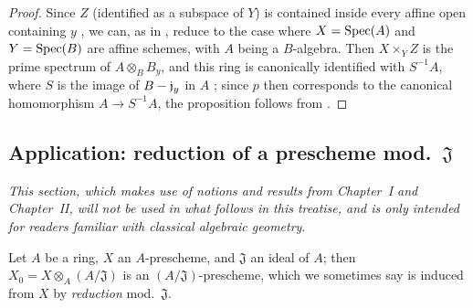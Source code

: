 \begin{proof}
\label{proof-1.3.6.5}
Since $Z$ (identified as a subspace of $Y$) is contained inside every affine open containing $y$ , we can, as in , reduce to the case where $X=\operatorname{Spec}(A)$ and $Y=\operatorname{Spec}(B)$ are affine schemes, with $A$ being a $B$-algebra.
Then $X\times_Y Z$ is the prime spectrum of $A\otimes_B B_y$, and this ring is canonically identified with $S^{-1}A$, where $S$ is the image of $B-\mathfrak{j}_y$ in $A$ ; since $p$ then corresponds to the canonical homomorphism $A\to S^{-1}A$, the proposition follows from .
\end{proof}

\subsection{Application: reduction of a prescheme mod.~$\mathfrak{J}$}
\label{subsection:1.3.7}

\emph{This section, which makes use of notions and results from Chapter~I and Chapter~II, will not be used in what follows in this treatise, and is only intended for readers familiar with classical algebraic geometry}.

\begin{env}[3.7.1]
\label{1.3.7.1}
Let $A$ be a ring, $X$ an $A$-prescheme, and $\mathfrak{J}$ an ideal of $A$; then $X_0=X\otimes_A(A/\mathfrak{J})$ is an $(A/\mathfrak{J})$-prescheme, which we sometimes say is induced from $X$ by \emph{reduction} mod.~$\mathfrak{J}$.
\end{env}

